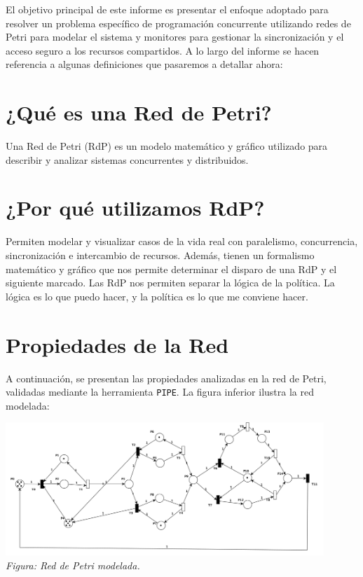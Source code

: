 \documentclass[12pt]{article}
\begin{document}
El objetivo principal de este informe es presentar el enfoque adoptado para resolver un problema específico de programación concurrente utilizando redes de Petri para modelar el sistema y monitores para gestionar la sincronización y el acceso seguro a los recursos compartidos. A lo largo del informe se hacen referencia a algunas definiciones que pasaremos a detallar ahora:

\section{¿Qué es una Red de Petri?}
Una Red de Petri (RdP) es un modelo matemático y gráfico utilizado para describir y analizar sistemas concurrentes y distribuidos.

\section{¿Por qué utilizamos RdP?}
Permiten modelar y visualizar casos de la vida real con paralelismo, concurrencia, sincronización e intercambio de recursos. Además, tienen un formalismo matemático y gráfico que nos permite determinar el disparo de una RdP y el siguiente marcado. Las RdP nos permiten separar la lógica de la política. La lógica es lo que puedo hacer, y la política es lo que me conviene hacer.

\section{Propiedades de la Red}
A continuación, se presentan las propiedades analizadas en la red de Petri, validadas mediante la herramienta \texttt{PIPE}. La figura inferior ilustra la red modelada:

\begin{center}
    \includegraphics[width=0.9\textwidth]{Petri-Net.png}\\[0.5em]
    \textit{Figura: Red de Petri modelada.}
\end{center}
\end{document}
